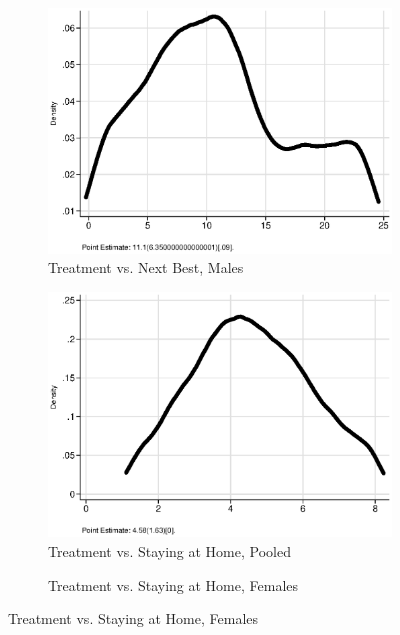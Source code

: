 \begin{figure}
\begin{subfigure}[h]{0.25\textwidth}
		\centering
		\caption{Treatment vs. Next Best, Males}
		\includegraphics[width=\textwidth]{output/ratios_2_sexm.eps}
\end{subfigure}
\begin{subfigure}[h]{0.25\textwidth}
	\centering
	\caption{Treatment vs. Staying at Home, Pooled}
		\includegraphics[width=\textwidth]{output/ratios_5_sexp.eps}
\end{subfigure}%
\begin{subfigure}[h]{0.25\textwidth}
	\centering
	\caption{Treatment vs. Staying at Home, Females}

\end{subfigure}
\end{figure}
